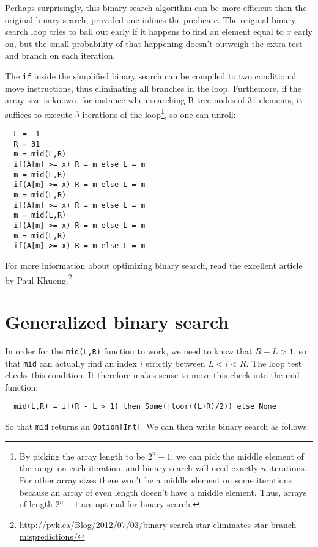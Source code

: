 \documentclass[a4paper, 11pt]{article}
\begin{document}
Perhaps surprisingly, this binary search algorithm can be more efficient than the original binary search, provided one inlines the predicate. The original binary search loop tries to bail out early if it happens to find an element equal to $x$ early on, but the small probability of that happening doesn't outweigh the extra test and branch on each iteration.

The \lstinline|if| inside the simplified binary search can be compiled to two conditional move instructions, thus eliminating all branches in the loop. Furthemore, if the array size is known, for instance when searching B-tree nodes of 31 elements, it suffices to execute $5$ iterations of the loop\footnote{By picking the array length to be $2^n - 1$, we can pick the middle element of the range on each iteration, and binary search will need exactly $n$ iterations. For other array sizes there won't be a middle element on some iterations because an array of even length doesn't have a middle element. Thus, arrays of length $2^n - 1$ are optimal for binary search.}, so one can unroll:

\begin{lstlisting}
  L = -1
  R = 31
  m = mid(L,R)
  if(A[m] >= x) R = m else L = m
  m = mid(L,R)
  if(A[m] >= x) R = m else L = m
  m = mid(L,R)
  if(A[m] >= x) R = m else L = m
  m = mid(L,R)
  if(A[m] >= x) R = m else L = m
  m = mid(L,R)
  if(A[m] >= x) R = m else L = m
\end{lstlisting}

\noindent For more information about optimizing binary search, read the excellent article by Paul Khuong.\footnote{\url{http://pvk.ca/Blog/2012/07/03/binary-search-star-eliminates-star-branch-mispredictions/}}

\section{Generalized binary search}

In order for the \lstinline|mid(L,R)| function to work, we need to know that $R-L>1$, so that \lstinline|mid| can actually find an index $i$ strictly between $L < i < R$. The loop test checks this condition. It therefore makes sense to move this check into the mid function:

\begin{lstlisting}
  mid(L,R) = if(R - L > 1) then Some(floor((L+R)/2)) else None
\end{lstlisting}

\noindent So that \lstinline|mid| returns an \lstinline|Option[Int]|. We can then write binary search as follows:
\end{document}

